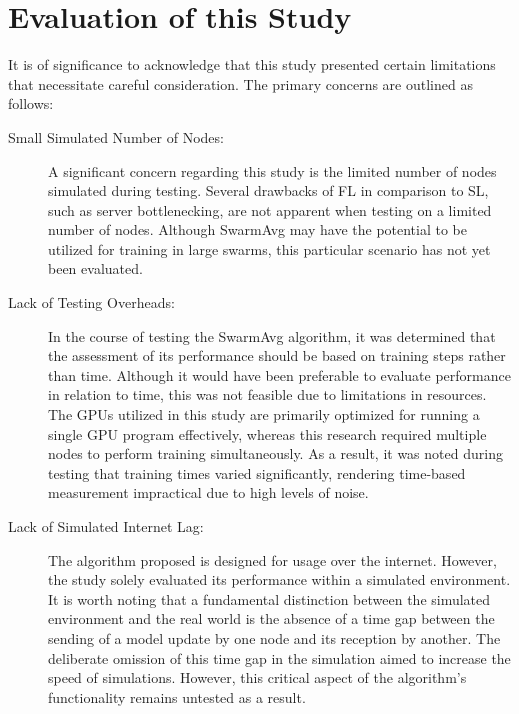 \section{Evaluation of this Study}
It is of significance to acknowledge that this study presented certain limitations that necessitate careful consideration. The primary concerns are outlined as follows:

\begin{description}
	\item[Small Simulated Number of Nodes: ] A significant concern regarding this study is the limited number of nodes simulated during testing. Several drawbacks of FL in comparison to SL, such as server bottlenecking, are not apparent when testing on a limited number of nodes. Although SwarmAvg may have the potential to be utilized for training in large swarms, this particular scenario has not yet been evaluated.
	
	\item[Lack of Testing Overheads: ] In the course of testing the SwarmAvg algorithm, it was determined that the assessment of its performance should be based on training steps rather than time. Although it would have been preferable to evaluate performance in relation to time, this was not feasible due to limitations in resources. The GPUs utilized in this study are primarily optimized for running a single GPU program effectively, whereas this research required multiple nodes to perform training simultaneously. As a result, it was noted during testing that training times varied significantly, rendering time-based measurement impractical due to high levels of noise.
	
	\item[Lack of Simulated Internet Lag: ] The algorithm proposed is designed for usage over the internet. However, the study solely evaluated its performance within a simulated environment. It is worth noting that a fundamental distinction between the simulated environment and the real world is the absence of a time gap between the sending of a model update by one node and its reception by another. The deliberate omission of this time gap in the simulation aimed to increase the speed of simulations. However, this critical aspect of the algorithm's functionality remains untested as a result.
\end{description}